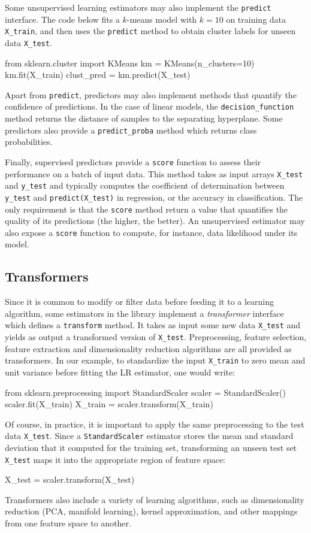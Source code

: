 \documentclass[twocolumn]{article}
\begin{document}
Some unsupervised learning estimators may also implement the \texttt{predict}
interface. The code below fits a $k$-means model with $k=10$ on
training data \texttt{X\_train}, and then uses the  \texttt{predict} method to
obtain cluster labels for unseen data \texttt{X\_test}.
\begin{pythoncode}
from sklearn.cluster import KMeans
km = KMeans(n_clusters=10)
km.fit(X_train)
clust_pred = km.predict(X_test)
\end{pythoncode}

Apart from \texttt{predict}, predictors may also implement methods
that quantify the confidence of predictions. In the case of
linear models, the \texttt{decision\_function} method returns
the distance of samples to the separating hyperplane. Some
predictors also provide a \texttt{predict\_proba} method which returns
class probabilities.

Finally, supervised predictors provide a \texttt{score} function to assess their
performance on a batch of input data. This method
takes as input arrays \texttt{X\_test} and \texttt{y\_test} and typically
computes the coefficient of determination between \texttt{y\_test} and
\texttt{predict(X\_test)} in regression, or the accuracy
in classification.
The only requirement is that the \texttt{score} method return a value
that quantifies the quality of its predictions (the higher, the better).
An unsupervised estimator may also expose a \texttt{score} function
to compute, for instance, data likelihood under its model.

\subsection{Transformers}

Since it is common to modify or filter data before feeding it to a learning
algorithm, some estimators in the library implement a \textit{transformer}
interface which defines a \texttt{transform} method. It takes as input some new
data \texttt{X\_test} and yields as output a transformed version of
\texttt{X\_test}. Preprocessing, feature selection, feature extraction and dimensionality reduction
algorithms are all provided as transformers.  In our example,
to standardize the input \texttt{X\_train} to zero mean and unit variance
before fitting the LR estimator, one would write:
\begin{pythoncode}
from sklearn.preprocessing import StandardScaler
scaler = StandardScaler()
scaler.fit(X_train)
X_train = scaler.transform(X_train)
\end{pythoncode}
Of course, in practice, it is important to apply the same preprocessing to the
test data \texttt{X\_test}. Since a \texttt{StandardScaler} estimator stores the
mean and standard deviation that it computed for the training set, transforming
an unseen test set \texttt{X\_test} maps it into the appropriate region of
feature space:
\begin{pythoncode}
X_test = scaler.transform(X_test)
\end{pythoncode}
Transformers also include a variety of learning algorithms, such as
dimensionality reduction (PCA, manifold learning), kernel approximation,
and other mappings from one feature space to another.
\end{document}
